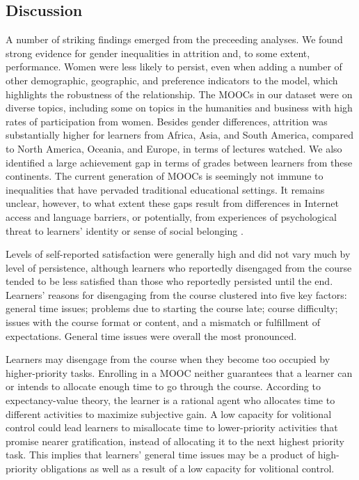 \documentclass{sigchi}\usepackage[]{graphicx}\usepackage[]{color}
\begin{document}
\subsection{Discussion}

A number of striking findings emerged from the preceeding analyses. We found strong evidence for gender inequalities in attrition and, to some extent, performance. Women were less likely to persist, even when adding a number of other demographic, geographic, and preference indicators to the model, which highlights the robustness of the relationship. The MOOCs in our dataset were on diverse topics, including some on topics in the humanities and business with high rates of participation from women. Besides gender differences, attrition was substantially higher for learners from Africa, Asia, and South America, compared to North America, Oceania, and Europe, in terms of lectures watched. We also identified a large achievement gap in terms of grades between learners from these continents. The current generation of MOOCs is seemingly not immune to inequalities that have pervaded traditional educational settings. It remains unclear, however, to what extent these gaps result from differences in Internet access and language barriers, or potentially, from experiences of psychological threat to learners' identity or sense of social belonging \cite{walton2007question}.

Levels of self-reported satisfaction were generally high and did not vary much by level of persistence, although learners who reportedly disengaged from the course tended to be less satisfied than those who reportedly persisted until the end. Learners' reasons for disengaging from the course clustered into five key factors: general time issues; problems due to starting the course late; course difficulty; issues with the course format or content, and a mismatch or fulfillment of expectations. General time issues were overall the most pronounced. 

Learners may disengage from the course when they become too occupied by higher-priority tasks. Enrolling in a MOOC neither guarantees that a learner can or intends to allocate enough time to go through the course. According to expectancy-value theory, the learner is a rational agent who allocates time to different activities to maximize subjective gain. A low capacity for volitional control \cite{corno2001volitional} could lead learners to misallocate time to lower-priority activities that promise nearer gratification, instead of allocating it to the next highest priority task. This implies that learners' general time issues may be a product of high-priority obligations as well as a result of a low capacity for volitional control.
\end{document}
